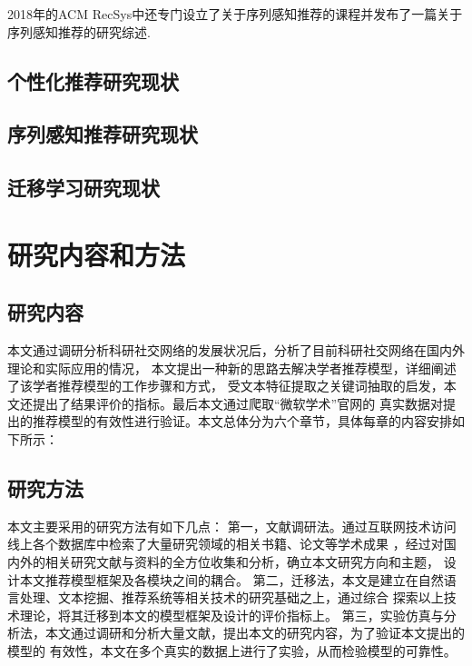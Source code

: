 2018年的ACM RecSys中还专门设立了关于序列感知推荐的课程并发布了一篇关于序列感知推荐的研究综述.
\subsection{个性化推荐研究现状}
\subsection{序列感知推荐研究现状}
\subsection{迁移学习研究现状}


\section{研究内容和方法}
\subsection{研究内容}
本文通过调研分析科研社交网络的发展状况后，分析了目前科研社交网络在国内外理论和实际应用的情况，%
本文提出一种新的思路去解决学者推荐模型，详细阐述了该学者推荐模型的工作步骤和方式，%
受文本特征提取之关键词抽取的启发，本文还提出了结果评价的指标。最后本文通过爬取“微软学术”官网的%
真实数据对提出的推荐模型的有效性进行验证。本文总体分为六个章节，具体每章的内容安排如下所示：

\subsection{研究方法}
本文主要采用的研究方法有如下几点：
第一，文献调研法。通过互联网技术访问线上各个数据库中检索了大量研究领域的相关书籍、论文等学术成果%
，经过对国内外的相关研究文献与资料的全方位收集和分析，确立本文研究方向和主题，%
设计本文推荐模型框架及各模块之间的耦合。
第二，迁移法，本文是建立在自然语言处理、文本挖掘、推荐系统等相关技术的研究基础之上，通过综合%
探索以上技术理论，将其迁移到本文的模型框架及设计的评价指标上。
第三，实验仿真与分析法，本文通过调研和分析大量文献，提出本文的研究内容，为了验证本文提出的模型的%
有效性，本文在多个真实的数据上进行了实验，从而检验模型的可靠性。

